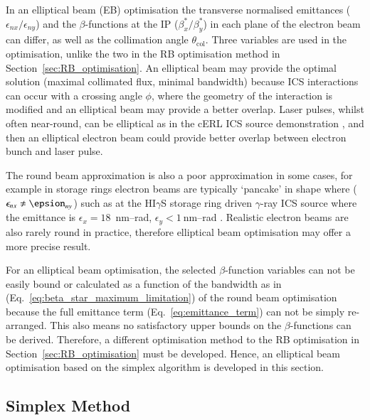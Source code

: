 \documentclass[../main.tex]{subfiles}
\begin{document}
In an elliptical beam (EB) optimisation the transverse normalised emittances ($\epsilon_{nx}/\epsilon_{ny}$) and the $\beta$-functions at the IP ($\beta_{x}^{*}/\beta_{y}^{*}$) in each plane of the electron beam can differ, as well as the collimation angle $\theta_{\mathrm{col}}$. Three variables are used in the optimisation, unlike the two in the RB optimisation method in Section~\ref{sec:RB_optimisation}. An elliptical beam may provide the optimal solution (maximal collimated flux, minimal bandwidth) because ICS interactions can occur with a crossing angle $\phi$, where the geometry of the interaction is modified and an elliptical beam may provide a better overlap. Laser pulses, whilst often near-round, can be elliptical as in the cERL ICS source demonstration \cite{akagi2016narrow}, and then an elliptical electron beam could provide better overlap between electron bunch and laser pulse.     

The round beam approximation is also a poor approximation in some cases, for example in storage rings electron beams are typically `pancake' in shape where ($\epsilon_{nx} \neq \epsion_{ny}$) such as at the HI$\gamma$S storage ring driven $\gamma$-ray ICS source where the emittance is $\epsilon_{x} = 18$~\si{\nano\meter}--\si{\radian}, $\epsilon_{y} < 1~\si{\nano\meter}$--\si{\radian} \cite{wu1996performance,weller2009research}. Realistic electron beams are also rarely round in practice, therefore elliptical beam optimisation may offer a more precise result.

For an elliptical beam optimisation, the selected $\beta$-function variables can not be easily bound or calculated as a function of the bandwidth as in (Eq.~\ref{eq:beta_star_maximum_limitation}) of the round beam optimisation because the full emittance term (Eq.~\ref{eq:emittance_term}) can not be simply re-arranged. This also means no satisfactory upper bounds on the $\beta$-functions can be derived. Therefore, a different optimisation method to the RB optimisation in Section~\ref{sec:RB_optimisation} must be developed. Hence, an elliptical beam optimisation based on the simplex algorithm is developed in this section.  

\subsection{Simplex Method}
\label{sec:simplex_optimisation}
\end{document}
